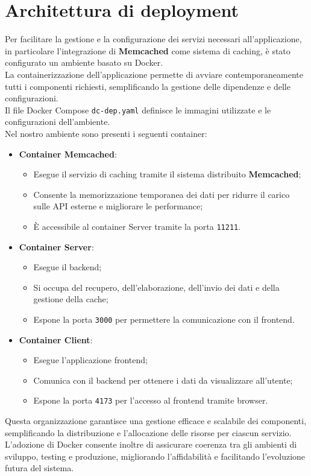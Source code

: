 \section{Architettura di deployment}

Per facilitare la gestione e la configurazione dei servizi necessari all'applicazione, in particolare l'integrazione di \textbf{Memcached} come sistema di caching, è stato configurato un ambiente basato su Docker.\\
La containerizzazione dell'applicazione permette di avviare contemporaneamente tutti i componenti richiesti, semplificando la gestione delle dipendenze e delle configurazioni.\\
Il file Docker Compose \texttt{dc-dep.yaml} definisce le immagini utilizzate e le configurazioni dell’ambiente.\\

Nel nostro ambiente sono presenti i seguenti container:

\begin{itemize}
    \item \textbf{Container Memcached}:
    \begin{itemize}
        \item Esegue il servizio di caching tramite il sistema distribuito \textbf{Memcached};
        \item Consente la memorizzazione temporanea dei dati per ridurre il carico sulle API esterne e migliorare le performance;
        \item È accessibile al container Server tramite la porta \texttt{11211}.
    \end{itemize}
    
    \item \textbf{Container Server}:
    \begin{itemize}
        \item Esegue il backend;
        \item Si occupa del recupero, dell'elaborazione, dell'invio dei dati e della gestione della cache;
        \item Espone la porta \texttt{3000} per permettere la comunicazione con il frontend.
    \end{itemize}
    
    \item \textbf{Container Client}:
    \begin{itemize}
        \item Esegue l'applicazione frontend;
        \item Comunica con il backend per ottenere i dati da visualizzare all'utente;
        \item Espone la porta \texttt{4173} per l'accesso al frontend tramite browser.
    \end{itemize}
\end{itemize}

Questa organizzazione garantisce una gestione efficace e scalabile dei componenti, semplificando la distribuzione e l'allocazione delle risorse per ciascun servizio. 
L'adozione di Docker consente inoltre di assicurare coerenza tra gli ambienti di sviluppo, testing e produzione, migliorando l'affidabilità e facilitando l'evoluzione futura del sistema.
